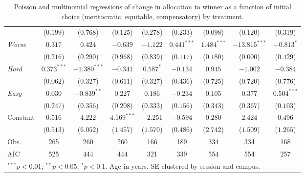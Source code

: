 \begin{table}[htpb]
\begin{tabular}{l cccc | cccc}
           & ($0.199$) & ($0.768$) & ($0.125$) & ($0.278$) & ($0.233$) & ($0.098$) & ($0.120$) & ($0.319$) \\
\textit{Worse} & $0.317$ & $0.424$ & $-0.639$ & $-1.122$ & $0.441^{***}$ & $1.484^{***}$ & $-13.815^{***}$ & $-0.813^{*}$ \\
           & ($0.216$) & ($0.290$) & ($0.968$) & ($0.839$) & ($0.117$) & ($0.180$) & ($0.000$) & ($0.429$) \\
\textit{Hard} & $0.373^{***}$ & $-1.380^{***}$ & $-0.341$ & $0.587^{*}$ & $-0.134$ & $0.945$ & $-1.002$ & $-0.384$ \\
           & ($0.062$) & ($0.327$) & ($0.611$) & ($0.327$) & ($0.436$) & ($0.725$) & ($0.720$) & ($0.776$) \\
\textit{Easy} & $0.030$ & $-0.839^{**}$ & $0.227$ & $0.186$ & $-0.234$ & $0.105$ & $0.377$ & $0.504^{***}$ \\
           & ($0.247$) & ($0.356$) & ($0.208$) & ($0.333$) & ($0.156$) & ($0.343$) & ($0.367$) & ($0.103$) \\
Constant & $0.516$ & $4.222$ & $4.169^{***}$ & $-2.251$ & $-0.594$ & $0.280$ & $2.424$ & $0.496$ \\
           & ($0.513$) & ($6.052$) & ($1.457$) & ($1.570$) & ($0.486$) & ($2.742$) & ($1.509$) & ($1.265$) \\
\midrule
Obs. & 265 & 260 & 260 & 166 & 189 & 334 & 334 & 168 \\
AIC  & 525 & 444 & 444 & 321 & 339 & 554 & 554 & 257 \\
\bottomrule
\multicolumn{9}{l}{\footnotesize $^{***}p<0.01$; $^{**}p<0.05$; $^{*}p<0.1$. Age in years. SE clustered by session and campus.}
\end{tabular}
\caption{Poisson and multinomial regressions of change in allocation to winner as a function of initial choice (meritocratic, equitable, compensatory) by treatment.}
\label{fig-change-all}
\end{table}
